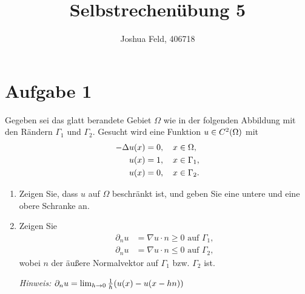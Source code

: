 \documentclass{exercise}
\institute{Applied and Computational Mathematics}
\title{Selbstrechenübung 5}
\author{Joshua Feld, 406718}
\begin{document}
    \maketitle


    \section*{Aufgabe 1}
    
    \begin{problem}
        Gegeben sei das glatt berandete Gebiet \(\Omega\) wie in der folgenden Abbildung mit den Rändern \(\Gamma_1\) und \(\Gamma_2\).
        Gesucht wird eine Funktion \(u \in C^2\parentheses*{\Omega}\) mit
        \begin{align*}
            -\Delta u\parentheses*{x} &= 0, \quad x \in \Omega,\\
            u\parentheses*{x} &= 1, \quad x \in \Gamma_1,\\
            u\parentheses*{x} &= 0, \quad x \in \Gamma_2.
        \end{align*}
        \begin{center}
        \end{center}
        \begin{enumerate}
            \item Zeigen Sie, dass \(u\) auf \(\Omega\) beschränkt ist, und geben Sie eine untere und eine obere Schranke an.
            \item Zeigen Sie
            \begin{align*}
                \partial_n u &= \nabla u \cdot n \ge 0\text{ auf }\Gamma_1,\\
                \partial_n u &= \nabla u \cdot n \le 0\text{ auf }\Gamma_2,
            \end{align*}
            wobei \(n\) der äußere Normalvektor auf \(\Gamma_1\) bzw. \(\Gamma_2\) ist.

            \emph{Hinweis: \(\partial_n u = \lim_{h \to 0}\frac{1}{h}\parentheses*{u\parentheses*{x} - u\parentheses*{x - hn}}\)}
        \end{enumerate}
    \end{problem}
    
\end{document}
